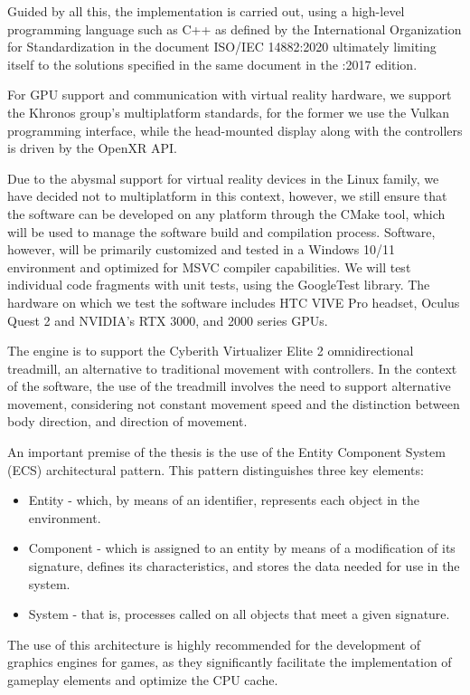 Guided by all this, the implementation is carried out, using a high-level programming language such as C++ as defined by the International Organization for Standardization in the document ISO/IEC 14882:2020 ultimately limiting itself to the solutions specified in the same document in the :2017 edition.

For GPU support and communication with virtual reality hardware, we support the Khronos group's multiplatform standards, for the former we use the Vulkan programming interface, while the head-mounted display along with the controllers is driven by the OpenXR API.

Due to the abysmal support for virtual reality devices in the Linux family, we have decided not to multiplatform in this context, however, we still ensure that the software can be developed on any platform through the CMake tool, which will be used to manage the software build and compilation process. Software, however, will be primarily customized and tested in a Windows 10/11 environment and optimized for MSVC compiler capabilities. We will test individual code fragments with unit tests, using the GoogleTest library. The hardware on which we test the software includes HTC VIVE Pro headset, Oculus Quest 2 and NVIDIA's RTX 3000, and 2000 series GPUs.

The engine is to support the Cyberith Virtualizer Elite 2 omnidirectional treadmill, an alternative to traditional movement with controllers. In the context of the software, the use of the treadmill involves the need to support alternative movement, considering not constant movement speed and the distinction between body direction, and direction of movement.

An important premise of the thesis is the use of the Entity Component System (ECS) architectural pattern. This pattern distinguishes three key elements:
\begin{itemize}
    \item Entity - which, by means of an identifier, represents each object in the environment.
    \item Component - which is assigned to an entity by means of a modification of its signature, defines its characteristics, and stores the data needed for use in the system.
    \item System - that is, processes called on all objects that meet a given signature.
\end{itemize}

The use of this architecture is highly recommended for the development of graphics engines for games, as they significantly facilitate the implementation of gameplay elements and optimize the CPU cache.

